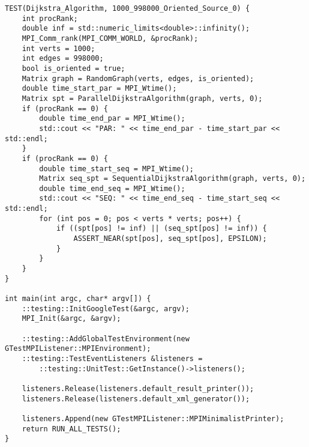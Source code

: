 \documentclass{report}
\begin{document}
\begin{lstlisting}
TEST(Dijkstra_Algorithm, 1000_998000_Oriented_Source_0) {
    int procRank;
    double inf = std::numeric_limits<double>::infinity();
    MPI_Comm_rank(MPI_COMM_WORLD, &procRank);
    int verts = 1000;
    int edges = 998000;
    bool is_oriented = true;
    Matrix graph = RandomGraph(verts, edges, is_oriented);
    double time_start_par = MPI_Wtime();
    Matrix spt = ParallelDijkstraAlgorithm(graph, verts, 0);
    if (procRank == 0) {
        double time_end_par = MPI_Wtime();
        std::cout << "PAR: " << time_end_par - time_start_par << std::endl;
    }
    if (procRank == 0) {
        double time_start_seq = MPI_Wtime();
        Matrix seq_spt = SequentialDijkstraAlgorithm(graph, verts, 0);
        double time_end_seq = MPI_Wtime();
        std::cout << "SEQ: " << time_end_seq - time_start_seq << std::endl;
        for (int pos = 0; pos < verts * verts; pos++) {
            if ((spt[pos] != inf) || (seq_spt[pos] != inf)) {
                ASSERT_NEAR(spt[pos], seq_spt[pos], EPSILON);
            }
        }
    }
}

int main(int argc, char* argv[]) {
    ::testing::InitGoogleTest(&argc, argv);
    MPI_Init(&argc, &argv);

    ::testing::AddGlobalTestEnvironment(new GTestMPIListener::MPIEnvironment);
    ::testing::TestEventListeners &listeners =
        ::testing::UnitTest::GetInstance()->listeners();

    listeners.Release(listeners.default_result_printer());
    listeners.Release(listeners.default_xml_generator());

    listeners.Append(new GTestMPIListener::MPIMinimalistPrinter);
    return RUN_ALL_TESTS();
}
\end{lstlisting}
\end{document}
